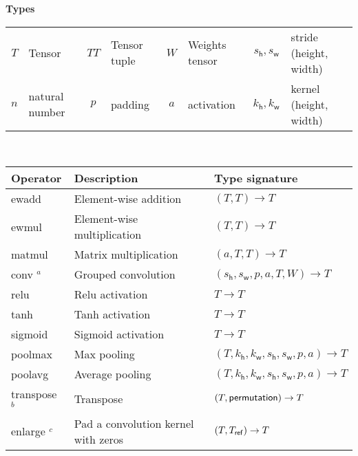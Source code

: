 \begin{table}[t]
    \centering
    \newcommand\act{\textsf{activation}}
    \newcommand\width{\textsf{w}}
    \newcommand\height{\textsf{h}}
    {\textbf{Types}
      \\[1mm]
      \small
    \begin{tabular}{cl|cl|cl|cl}
      $T$ & Tensor
      & $TT$ & Tensor tuple
      & $W$ & Weights tensor
      & $s_\height, s_\width$ & stride (height, width) \\
      $n$ & natural number
      & $p$  & padding
      & $a$ & activation
      & $k_\height, k_\width$ & kernel (height, width) \\
    \end{tabular}}
    \\[2em]
    \begin{tabular}{lll}
        {\bf Operator}  & {\bf Description}                    & {\bf Type signature} \\
    \hline
        \sf ewadd           & Element-wise addition                & $(T, T) \rightarrow T$ \\
        \sf ewmul           & Element-wise multiplication          & $(T, T) \rightarrow T$ \\
        \sf matmul          & Matrix multiplication                & $(a, T, T) \rightarrow T$ \\
        \sf conv $^a$       & Grouped convolution                  & $(s_\height, s_\width, p, a, T, W) \rightarrow T$ \\
        \sf relu            & Relu activation                      & $T \rightarrow T$ \\
        \sf tanh            & Tanh activation                      & $T \rightarrow T$ \\
        \sf sigmoid         & Sigmoid activation                   & $T \rightarrow T$ \\
        \sf poolmax         & Max pooling                          & $(T, k_\height, k_\width, s_\height, s_\width, p, a) \rightarrow T$ \\
        \sf poolavg         & Average pooling                      & $(T, k_\height, k_\width, s_\height, s_\width, p, a) \rightarrow T$ \\
        \sf transpose $^b$  & Transpose                            & $(T, {\sf permutation}) \rightarrow T$ \\
        \sf enlarge $^c$    & Pad a convolution kernel with zeros  & $(T, T_{\sf ref}) \rightarrow T$ \\

\end{tabular}
\end{table}
